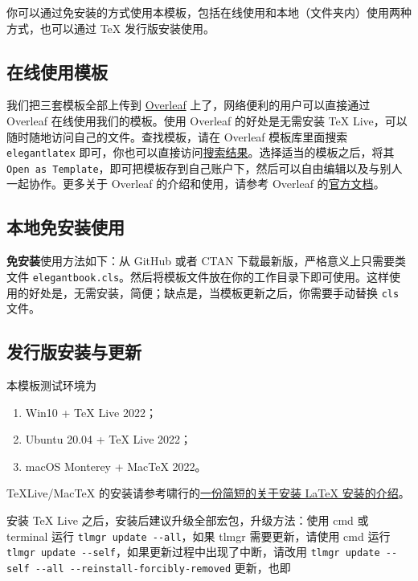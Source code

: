 \documentclass[lang=cn,10pt,cite=super]{elegantbook}
\begin{document}
你可以通过免安装的方式使用本模板，包括在线使用和本地（文件夹内）使用两种方式，也可以通过 \TeX{} 发行版安装使用。

\subsection{在线使用模板}

我们把三套模板全部上传到 \href{https://www.overleaf.com/}{Overleaf} 上了，网络便利的用户可以直接通过 Overleaf 在线使用我们的模板。使用 Overleaf 的好处是无需安装 \TeX{} Live，可以随时随地访问自己的文件。查找模板，请在 Overleaf 模板库里面搜索 \lstinline{elegantlatex} 即可，你也可以直接访问\href{https://www.overleaf.com/latex/templates?addsearch=elegantlatex}{搜索结果}。选择适当的模板之后，将其 \lstinline{Open as Template}，即可把模板存到自己账户下，然后可以自由编辑以及与别人一起协作。更多关于 Overleaf 的介绍和使用，请参考 Overleaf 的\href{https://www.overleaf.com/learn}{官方文档}。

\subsection{本地免安装使用}

\textbf{免安装}使用方法如下：从 GitHub 或者 CTAN 下载最新版，严格意义上只需要类文件 \lstinline{elegantbook.cls}。然后将模板文件放在你的工作目录下即可使用。这样使用的好处是，无需安装，简便；缺点是，当模板更新之后，你需要手动替换 \lstinline{cls} 文件。

\subsection{发行版安装与更新}

本模板测试环境为 
\begin{enumerate}
  \item Win10 + \TeX{} Live 2022；
  \item Ubuntu 20.04 + \TeX{} Live 2022；
  \item macOS Monterey + Mac\TeX{} 2022。
\end{enumerate}

\TeX Live/Mac\TeX{} 的安装请参考啸行的\href{https://github.com/OsbertWang/install-latex-guide-zh-cn/releases/}{一份简短的关于安装 \LaTeX{} 安装的介绍}。

安装 \TeX{} Live 之后，安装后建议升级全部宏包，升级方法：使用 cmd 或 terminal 运行 \lstinline{tlmgr update --all}，如果 tlmgr 需要更新，请使用 cmd 运行 \lstinline{tlmgr update --self}，如果更新过程中出现了中断，请改用 \lstinline{tlmgr update --self --all --reinstall-forcibly-removed} 更新，也即
\end{document}

